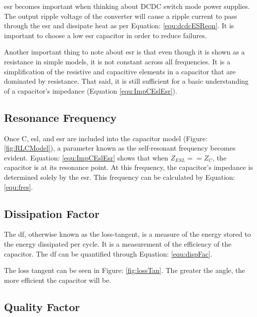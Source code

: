 \gls{esr} becomes important when thinking about DCDC switch mode power supplies. The output ripple voltage of the converter will cause a ripple current to pass through the \gls{esr} and dissipate heat as per Equation: \eqref{equ:dcdcESReqn}. It is important to choose a low \gls{esr} capacitor in order to reduce failures.


Another important thing to note about \gls{esr} is that even though it is shown as a resistance in simple models, it is not constant across all frequencies. It is a simplification of the resistive and capacitive elements in a capacitor that are dominated by resistance. That said, it is still sufficient for a basic understanding of a capacitor's impedance (Equation \eqref{equ:ImpCEslEsr}).


\subsection{Resonance Frequency}


Once C, \gls{esl}, and \gls{esr} are included into the capacitor model (Figure: \ref{fig:RLCModel}), a parameter known as the self-resonant frequency becomes evident. Equation: \eqref{equ:ImpCEslEsr} shows that when $Z_{ESL} == Z_C$, the capacitor is at its resonance point. At this frequency, the capacitor's impedance is determined solely by the \gls{esr}. This frequency can be calculated by Equation: \eqref{equ:fres}.


\subsection{Dissipation Factor}


The \gls{df}, otherwise known as the loss-tangent, is a measure of the energy stored to the energy dissipated per cycle. It is a measurement of the efficiency of the capacitor. The \gls{df} can be quantified through Equation: \eqref{equ:dispFac}. 


The loss tangent can be seen in Figure: \ref{fig:lossTan}. The greater the angle, the more efficient the capacitor will be.

\subsection{Quality Factor}


